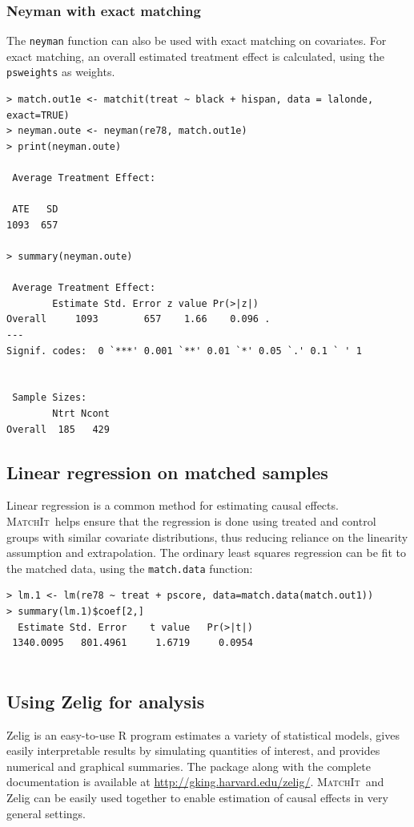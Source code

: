 \documentclass[oneside,letterpaper,titlepage]{article}
\newcommand{\MatchIt}{\textsc{MatchIt}}
\begin{document}
\subsubsection{Neyman with exact matching}
The {\tt neyman} function can also be used with exact matching on
covariates.  For exact matching, an overall estimated treatment effect
is calculated, using the {\tt psweights} as weights.

\begin{verbatim}
> match.out1e <- matchit(treat ~ black + hispan, data = lalonde, exact=TRUE)
> neyman.oute <- neyman(re78, match.out1e)
> print(neyman.oute)
 
 Average Treatment Effect:
  
 ATE   SD
1093  657
 
> summary(neyman.oute)
 
 Average Treatment Effect:
        Estimate Std. Error z value Pr(>|z|)
Overall     1093        657    1.66    0.096 .
---
Signif. codes:  0 `***' 0.001 `**' 0.01 `*' 0.05 `.' 0.1 ` ' 1
 
 
 Sample Sizes:
        Ntrt Ncont
Overall  185   429
\end{verbatim}

\subsection{Linear regression on matched samples}
Linear regression is a common method for estimating causal effects.
\MatchIt\ helps ensure that the regression is done using treated and
control groups with similar covariate distributions, thus reducing
reliance on the linearity assumption and extrapolation.  The ordinary
least squares regression can be fit to the matched data, using the
{\tt match.data} function:

\begin{verbatim}
> lm.1 <- lm(re78 ~ treat + pscore, data=match.data(match.out1))
> summary(lm.1)$coef[2,]
  Estimate Std. Error    t value   Pr(>|t|)
 1340.0095   801.4961     1.6719     0.0954


\end{verbatim}

\subsection{Using Zelig for analysis}
Zelig is an easy-to-use R program estimates a variety of statistical
models, gives easily interpretable results by simulating quantities of
interest, and provides numerical and graphical summaries.  The package
along with the complete documentation is available at
\href{http://gking.harvard.edu/zelig/}{http://gking.harvard.edu/zelig/}.
\MatchIt\ and Zelig can be easily used together to enable estimation
of causal effects in very general settings.
\end{document}
